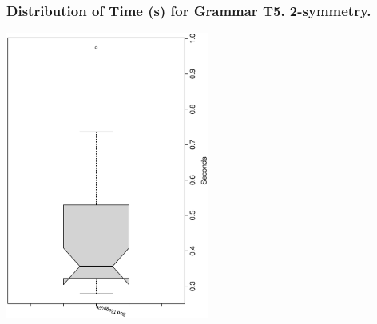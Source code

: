  \begin{frame}
 \frametitle{ Distribution of Time (s) for Grammar T5. 2-symmetry. }
 \begin{center}
\includegraphics[width=0.5\textwidth, angle=-90]
{ExpFboxplottSeconds000.eps}
 \end{center}
 \label{ExpFboxplottSeconds000.eps}  
 \end{frame}

